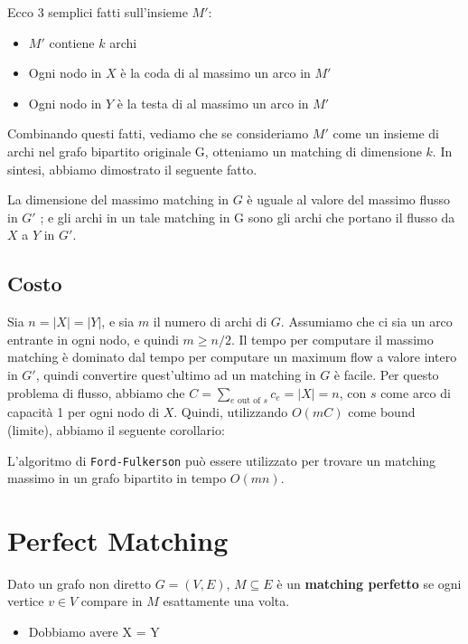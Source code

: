 Ecco 3 semplici fatti sull'insieme $M'$:
\begin{itemize}
	\item $M'$ contiene $k$ archi
	\item Ogni nodo in $X$ è la coda di al massimo un arco in $M'$
	\item Ogni nodo in $Y$ è la testa di al massimo un arco in $M'$
\end{itemize}

Combinando questi fatti, vediamo che se consideriamo $M'$ come un
insieme di archi nel grafo bipartito originale G, otteniamo un matching
di dimensione $k$. In sintesi, abbiamo dimostrato il seguente fatto.

\begin{myblockquote}
	La dimensione del massimo matching in $G$ è uguale al valore del
	massimo flusso in $G'$ ; e gli archi in un tale matching in G sono gli
	archi che portano il flusso da $X$ a $Y$ in $G'$.
\end{myblockquote}

\subsection{Costo}

Sia $n = |X| = |Y|$, e sia $m$ il numero di archi di $G$.
Assumiamo che ci sia un arco entrante in ogni nodo, e quindi
$m \ge n/2$. Il tempo per computare il massimo matching è dominato dal
tempo per computare un maximum flow a valore intero in $G'$, quindi
convertire quest'ultimo ad un matching in $G$ è facile. Per questo
problema di flusso, abbiamo che
$C = \sum_{e \text{ out of } s}c_e = |X| = n$, con $s$ come arco di
capacità 1 per ogni nodo di $X$. Quindi, utilizzando $O(mC)$ come
bound (limite), abbiamo il seguente corollario:
\begin{myblockquote}
	L'algoritmo di \texttt{Ford-Fulkerson} può essere utilizzato per trovare
	un matching massimo in un grafo bipartito in tempo $O(mn)$.
\end{myblockquote}


\section{Perfect Matching}

Dato un grafo non diretto $G=(V,E)$, $M \subseteq E$ è un
\textbf{matching perfetto} se ogni vertice $v \in V$ compare in $M$
esattamente una volta.
\begin{itemize}
	\item Dobbiamo avere \textbar X\textbar{} = \textbar Y\textbar{}
\end{itemize}

